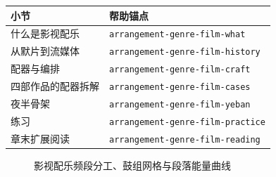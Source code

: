 \begin{helpmapping}
\begin{longtable}{p{}p{}}
\toprule
小节 & 帮助锚点 \\
\midrule
什么是影视配乐 & \texttt{arrangement-genre-film-what} \\
从默片到流媒体 & \texttt{arrangement-genre-film-history} \\
配器与编排 & \texttt{arrangement-genre-film-craft} \\
四部作品的配器拆解 & \texttt{arrangement-genre-film-cases} \\
夜半骨架 & \texttt{arrangement-genre-film-yeban} \\
练习 & \texttt{arrangement-genre-film-practice} \\
章末扩展阅读 & \texttt{arrangement-genre-film-reading} \\
\bottomrule
\end{longtable}
\end{helpmapping}

\begin{figure}[htbp]\centering
{}
\caption{影视配乐频段分工、鼓组网格与段落能量曲线}
\end{figure}
